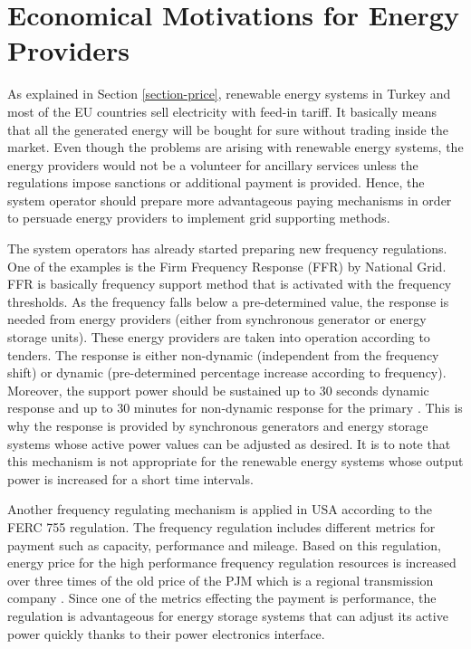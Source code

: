 \section{Economical Motivations for Energy Providers}
As explained in Section \ref{section-price}, renewable energy systems in Turkey and most of the EU countries sell electricity with feed-in tariff. It basically means that all the generated energy will be bought for sure without trading inside the market. Even though the problems are arising with renewable energy systems, the energy providers would not be a volunteer for ancillary services unless the regulations impose sanctions or additional payment is provided. Hence, the system operator should prepare more advantageous paying mechanisms in order to persuade energy providers to implement grid supporting methods. \par
The system operators has already started preparing new frequency regulations. One of the examples is the Firm Frequency Response (FFR) by National Grid. FFR is basically frequency support method that is activated with the frequency thresholds. As the frequency falls below a pre-determined value, the response is needed from energy providers (either from synchronous generator or energy storage units). These energy providers are taken into operation according to tenders. The response is either non-dynamic (independent from the frequency shift) or dynamic (pre-determined percentage increase according to frequency). Moreover, the support power should be sustained up to 30 seconds dynamic response and up to 30 minutes for non-dynamic response for the primary \cite{Smethurst2017}. This is why the response is provided by synchronous generators and energy storage systems whose active power values can be adjusted as desired. It is to note that this mechanism is not appropriate for the renewable energy systems whose output power is increased for a short time intervals. \par
Another frequency regulating mechanism is applied in USA according to the FERC 755 regulation. The frequency regulation includes different metrics for payment such as capacity, performance and mileage. Based on this regulation, energy price for the high performance frequency regulation resources is increased over three times of the old price of the PJM which is a regional transmission company \cite{NECEnergySolutions2014}. Since one of the metrics effecting the payment is performance, the regulation is advantageous for energy storage systems that can adjust its active power quickly thanks to their power electronics interface.\par
